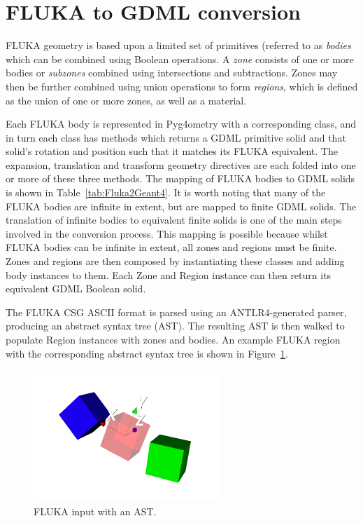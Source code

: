 \documentclass[final,5p,times,twocolumn]{elsarticle}
\begin{document}
\section{FLUKA to GDML conversion}
FLUKA geometry is based upon a limited set of primitives (referred to
as \textit{bodies} which can be combined using Boolean operations.  A
\textit{zone} consists of one or more bodies or \textit{subzones}
combined using intersections and subtractions.  Zones may then be
further combined using union operations to form \textit{regions},
which is defined as the union of one or more zones, as well as a
material.

Each FLUKA body is represented in Pyg4ometry with a corresponding
class, and in turn each class has methods which returns a GDML
primitive solid and that solid's rotation and position such that it
matches its FLUKA equivalent.  The expansion, translation and
transform geometry directives are each folded into one or more of
these three methods.  The mapping of FLUKA bodies to GDML solids is
shown in Table~\ref{tab:Fluka2Geant4}.  It is worth noting that many
of the FLUKA bodies are infinite in extent, but are mapped to finite
GDML solids.  The translation of infinite bodies to equivalent finite
solids is one of the main steps involved in the conversion process.
This mapping is possible because whilst FLUKA bodies can be infinite
in extent, all zones and regions must be finite.  Zones and regions
are then composed by instantiating these classes and adding body
instances to them.  Each Zone and Region instance can then return its
equivalent GDML Boolean solid.

The FLUKA CSG ASCII format is parsed using an ANTLR4-generated parser,
producing an abstract syntax tree (AST).  The resulting AST is then
walked to populate Region instances with zones and bodies.  An example
FLUKA region with the corresponding abstract syntax tree is shown in
Figure~\ref{fig:region-ast}.

\begin{figure}[htbp]
\begin{center}
\includegraphics[width=7cm]{./diagrams/rapidModelling.pdf}
\caption{FLUKA input with an AST.}
\label{fig:region-ast}
\end{center}
\end{figure}
\end{document}
